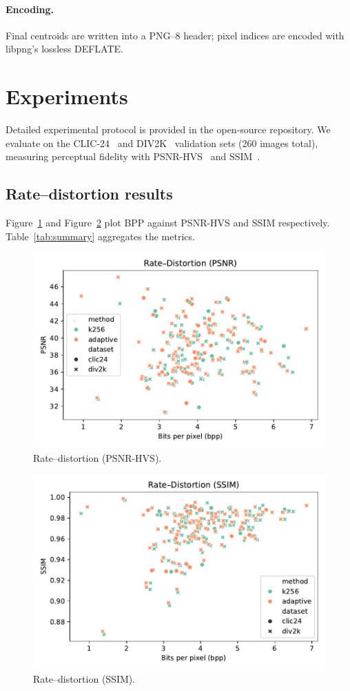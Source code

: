 \documentclass{../manuscript/Electrical new template/elektr}
\begin{document}
\paragraph{Encoding.}  Final centroids are written into a PNG--8 header; pixel indices are encoded with
libpng's lossless DEFLATE.

\section{Experiments}
Detailed experimental protocol is provided in the open-source repository.  We evaluate on the CLIC-24~\cite{clic} and DIV2K~\cite{div2k} validation sets (260 images total), measuring perceptual fidelity with PSNR-HVS~\cite{egiazarian2006psnrhvs} and SSIM~\cite{ssim2004}.

\subsection{Rate–distortion results}
Figure~\ref{fig:rd_psnr} and Figure~\ref{fig:rd_ssim} plot BPP against PSNR-HVS and SSIM respectively.  Table~\ref{tab:summary} aggregates the metrics.

\begin{figure}[!ht]
    \centering
    \includegraphics[width=0.9\linewidth]{../figures/rd_psnr.pdf}
    \caption{Rate–distortion (PSNR-HVS).}
    \label{fig:rd_psnr}
\end{figure}

\begin{figure}[!ht]
    \centering
    \includegraphics[width=0.9\linewidth]{../figures/rd_ssim.pdf}
    \caption{Rate–distortion (SSIM).}
    \label{fig:rd_ssim}
\end{figure}
\end{document}
